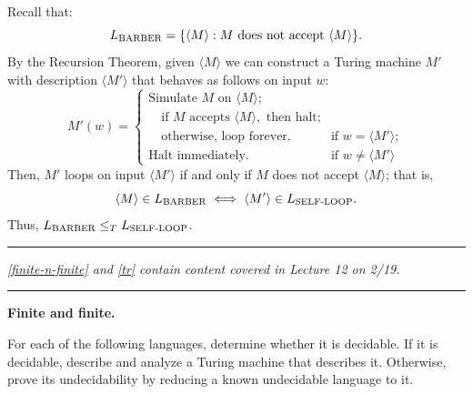 \documentclass[11pt,addpoints,answers]{exam}
\begin{document}
\begin{questions}
\begin{parts}
    \begin{solution} 
    Recall that:
    \[
    L_{\text{BARBER}} = \{\langle M\rangle : M \text{ does not accept } \langle M\rangle\}.
    \]
    By the Recursion Theorem, given \(\langle M\rangle\) we can construct a Turing machine \(M'\) with description \(\langle M'\rangle\) that behaves as follows on input \(w\):
    \[
    M'(w)=
    \begin{cases}
    \text{Simulate } M \text{ on } \langle M\rangle;\\[1ex]
    \quad \text{if } M \text{ accepts } \langle M\rangle, \text{ then halt;}\\[1ex]
    \quad \text{otherwise, loop forever}. & \text{if } w = \langle M'\rangle;\\[1ex]
    \text{Halt immediately}. & \text{if } w \neq \langle M'\rangle
    \end{cases}
    \]
    Then, \(M'\) loops on input \(\langle M'\rangle\) if and only if \(M\) does not accept \(\langle M\rangle\); that is,
    \[
    \langle M\rangle \in L_{\text{BARBER}} \iff \langle M'\rangle \in L_{\text{SELF-LOOP}}.
    \]
    Thus, \(L_{\text{BARBER}} \leq_T L_{\text{SELF-LOOP}}\).
    \end{solution}

\end{parts}

\medskip \hrule \medskip 
\emph{\cref{finite-n-finite} and \cref{tr} contain content covered in Lecture 12 on 2/19.}
\medskip \hrule \medskip

\question \textbf{Finite and finite.}\label{finite-n-finite}

  \label{finite}
  
  For each of the following languages, determine whether it is decidable. If it is decidable, describe and analyze a Turing machine that describes it. Otherwise, prove its undecidability by reducing a known undecidable language to it.


\end{questions}
\end{document}

